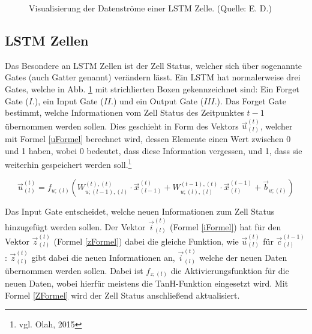\documentclass[
	a4paper,
	12pt,
	ngerman,
	oneside
]{scrreprt}											%
\begin{document}
\begin{figure}
				\caption{Visualisierung der Datenströme einer LSTM Zelle. (Quelle: E. D.)}\label{LSTMzellDarstellung}
			\end{figure}
				
			\subsection{LSTM Zellen}
				Das Besondere an LSTM Zellen ist der Zell Status, welcher sich über sogenannte Gates (auch Gatter genannt) verändern lässt. Ein LSTM hat normalerweise drei Gates, welche in Abb. \ref{LSTMzellDarstellung} mit strichlierten Boxen gekennzeichnet sind: Ein Forget Gate ($I.$), ein Input Gate ($II.$) und ein Output Gate ($III.$). Das Forget Gate bestimmt, welche Informationen vom Zell Status des Zeitpunktes $t-1$ übernommen werden sollen. Dies geschieht in Form des Vektors $\vec{u}_{(l)}^{(t)}$, welcher mit Formel \ref{uFormel} berechnet wird, dessen Elemente einen Wert zwischen 0 und 1 haben, wobei 0 bedeutet, dass diese Information vergessen, und 1, dass sie weiterhin gespeichert werden soll.\footnote{vgl. Olah, 2015}
				
				\begin{equation}\label{uFormel}
					\vec{u}_{(l)}^{(t)} = f_{u;(l)} \left( W_{u; (l-1),(l)}^{(t),(t)} \cdot \vec{x}_{(l-1)}^{(t)} + W_{u; (l),(l)}^{(t-1),(t)} \cdot \vec{x}_{(l)}^{(t-1)} + \vec{b}_{u; (l)} \right)
				\end{equation}
				
				Das Input Gate entscheidet, welche neuen Informationen zum Zell Status hinzugefügt werden sollen. Der Vektor $\vec{i}_{(l)}^{(t)}$ (Formel \ref{iFormel}) hat für den Vektor $\vec{z}_{(l)}^{(t)}$ (Formel \ref{zFormel}) dabei die gleiche Funktion, wie $\vec{u}_{(l)}^{(t)}$ für $\vec{c}_{(l)}^{(t-1)}$: $\vec{z}_{(l)}^{(t)}$ gibt dabei die neuen Informationen an, $\vec{i}_{(l)}^{(t)}$ welche der neuen Daten übernommen werden sollen. Dabei ist $f_{z;(l)}$ die Aktivierungsfunktion für die neuen Daten, wobei hierfür meistens die TanH-Funktion eingesetzt wird. Mit Formel \ref{ZFormel} wird der Zell Status anschließend aktualisiert.
				
\end{document}
